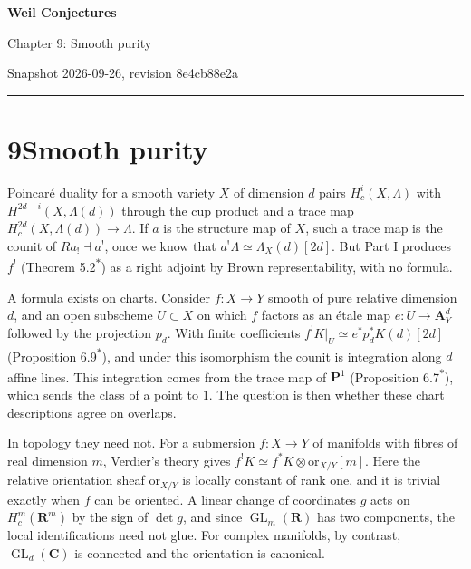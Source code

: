 \documentclass[11pt]{article}
\newcommand{\bpout}[1]{#1\textsuperscript{\hyperlink{bp-outside}{\ensuremath{\ast}}}}
\begin{document}
\pagestyle{plain}
\begin{center}
{\LARGE\bfseries Weil Conjectures\par}
\vspace{0.7em}
{\large Chapter 9: Smooth purity\par}
\vspace{0.5em}
{\small\color{bpmuted}Snapshot 2026-09-26, revision 8e4cb88e2a\par}
\end{center}
\vspace{0.5em}
{\small\tableofcontents}
\bigskip\hrule\bigskip

\section*{\texorpdfstring{9\quad Smooth purity}{9 Smooth purity}}
\label{bp1}%
\label{bp2}%
Poincaré duality for a smooth variety \(X\) of dimension \(d\) pairs \(H^i_c(X,\Lambda)\) with \(H^{2d-i}(X,\Lambda(d))\) through the cup product and a trace map \(H^{2d}_c(X,\Lambda(d))\to\Lambda\). If \(a\) is the structure map of \(X\), such a trace map is the counit of \(Ra_!\dashv a^!\), once we know that \(a^!\Lambda\simeq\Lambda_X(d)[2d]\). But Part I produces \(f^!\) (Theorem \bpout{5.2}) as a right adjoint by Brown representability, with no formula.

A formula exists on charts. Consider \(f:X\to Y\) smooth of pure relative dimension \(d\), and an open subscheme \(U\subset X\) on which \(f\) factors as an étale map \(e:U\to\mathbf A^d_Y\) followed by the projection \(p_d\). With finite coefficients \(f^!K|_U\simeq e^*p_d^*K(d)[2d]\) (Proposition \bpout{6.9}), and under this isomorphism the counit is integration along \(d\) affine lines. This integration comes from the trace map of \(\mathbf P^1\) (Proposition \bpout{6.7}), which sends the class of a point to \(1\). The question is then whether these chart descriptions agree on overlaps.

In topology they need not. For a submersion \(f:X\to Y\) of manifolds with fibres of real dimension \(m\), Verdier's theory gives \(f^!K\simeq f^*K\otimes\mathrm{or}_{X/Y}[m]\). Here the relative orientation sheaf \(\mathrm{or}_{X/Y}\) is locally constant of rank one, and it is trivial exactly when \(f\) can be oriented. A linear change of coordinates \(g\) acts on \(H^m_c(\mathbf R^m)\) by the sign of \(\det g\), and since \(\operatorname{GL}_m(\mathbf R)\) has two components, the local identifications need not glue. For complex manifolds, by contrast, \(\operatorname{GL}_d(\mathbf C)\) is connected and the orientation is canonical.
\end{document}
